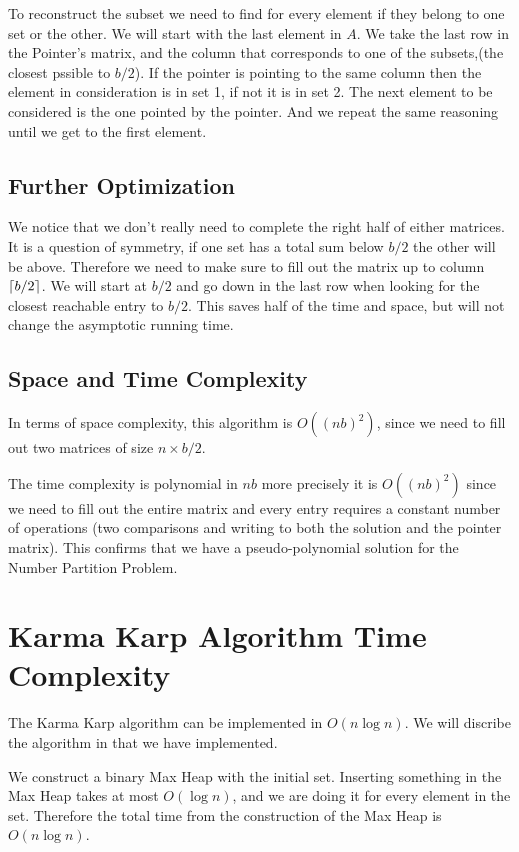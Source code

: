 \documentclass[11pt]{article}
\DeclarePairedDelimiter\ceil{\lceil}{\rceil}
\begin{document}
To reconstruct the subset we need to find for every element if they belong to one set or the other. We will start with the last element in $A$. We take the last row in the Pointer's matrix, and the column that corresponds to one of the subsets,(the closest pssible to $b/2$). If the pointer is pointing to the same column then the element in consideration is in set 1, if not it is in set 2. The next element to be considered is the one pointed by the pointer. And we repeat the same reasoning until we get to the first element.

\subsection{Further Optimization}
We notice that we don't really need to complete the right half of either matrices. It is a question of symmetry, if one set has a total sum below $b/2$ the other will be above. Therefore we need to make sure to fill out the matrix up to column $\ceil*{b/2}$. We will start at $b/2$ and go down in the last row when looking for the closest reachable entry to $b/2$.
This saves half of the time and space, but will not change the asymptotic running time. 

\subsection{Space and Time Complexity}

In terms of space complexity, this algorithm is $O((nb)^2)$, since we need to fill out two matrices of size $n\times b/2$.

The time complexity is polynomial in $nb$ more precisely it is $O((nb)^2)$ since we need to fill out the entire matrix and every entry requires a constant number of operations (two comparisons and writing to both the solution and the pointer matrix). This confirms that we have a pseudo-polynomial solution for the Number Partition Problem. 




\section{Karma Karp Algorithm Time Complexity}
The Karma Karp algorithm can be implemented in $O(n\log n)$. 
We will discribe the algorithm in that we have implemented.

We construct a binary Max Heap with the initial set. Inserting something in the Max Heap takes at most $O(\log n)$, and we are doing it for every element in the set. Therefore the total time from the construction of the Max Heap is $O(n \log n)$.
\end{document}
